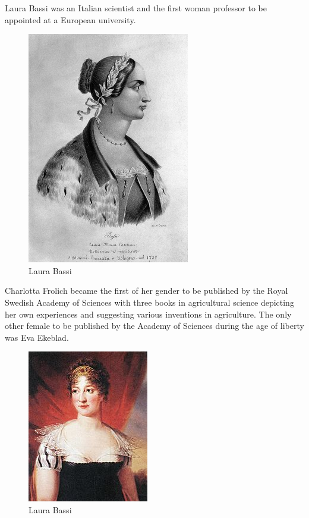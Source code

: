 \documentclass[a4paper,10pt]{article}
\begin{document}
\newblock
Laura Bassi was an Italian scientist and the first woman professor to be appointed at a European university\cite{laura}.

\begin{center}
\begin{figure}[h]
\centering
 \includegraphics[scale=0.9]{laura.png}
 \caption{Laura Bassi}
\end{figure}
\end{center}

\newblock
Charlotta Frolich became the first of her gender to be published by the Royal Swedish Academy of Sciences with three books in agricultural science depicting her own experiences and suggesting various inventions in agriculture. The only other female to be published by the Academy of Sciences during the age of liberty was Eva Ekeblad\cite{frolich}.

\begin{center}
\begin{figure}[h]
\centering
 \includegraphics[scale=0.7]{charlotta.jpg}
 \caption{Laura Bassi}
\end{figure}
\end{center}
\end{document}
